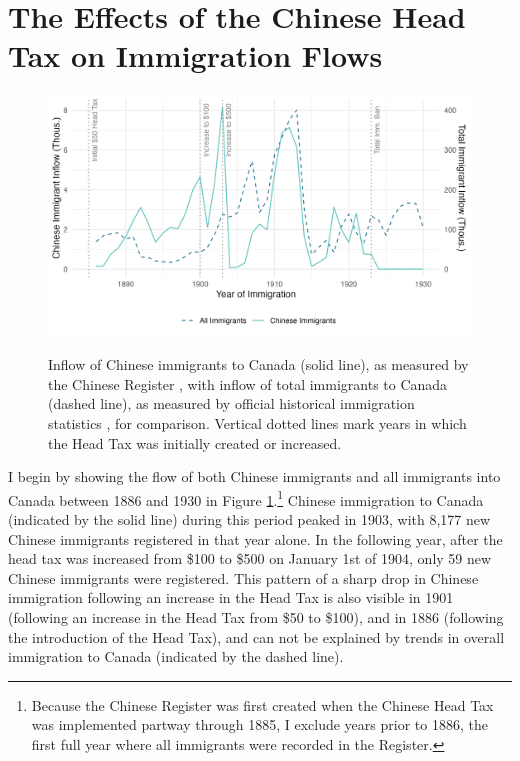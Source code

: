 
\section{The Effects of the Chinese Head Tax on Immigration Flows}

\begin{figure}[!h]
    \centering 
    \caption{Inflow of Chinese immigrants to Canada (solid line), as measured by the Chinese Register \citep{chineseregister}, with inflow of total immigrants to Canada (dashed line), as measured by official historical immigration statistics \citep{canimm}, for comparison. Vertical dotted lines mark years in which the Head Tax was initially created or increased.}
    \includegraphics[width=\textwidth]{../../figs/fig1_immflow.png}
    \label{fig:inflow}
\end{figure}

I begin by showing the flow of both Chinese immigrants and all immigrants into Canada between 1886 and 1930 in Figure \ref{fig:inflow}.\footnote{Because the Chinese Register was first created when the Chinese Head Tax was implemented partway through 1885, I exclude years prior to 1886, the first full year where all immigrants were recorded in the Register.}
Chinese immigration to Canada (indicated by the solid line) during this period peaked in 1903, with 8,177 new Chinese immigrants registered in that year alone. In the following year, after the head tax was increased from \$100 to \$500 on January 1st of 1904, only 59 new Chinese immigrants were registered. This pattern of a sharp drop in Chinese immigration following an increase in the Head Tax is also visible in 1901 (following an increase in the Head Tax from \$50 to \$100), and in 1886 (following the introduction of the Head Tax), and can not be explained by trends in overall immigration to Canada (indicated by the dashed line).

